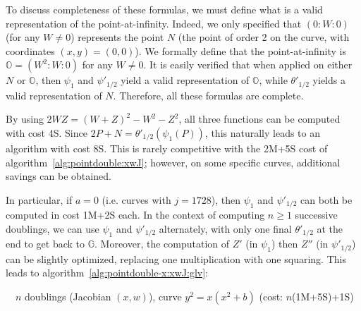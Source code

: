 \documentclass{llncs}
\newcommand{\bG}{\mathbb{G}}
\newcommand{\neutral}{\mathbb{O}}
\begin{document}
To discuss completeness of these formulas, we must define what is a
valid representation of the point-at-infinity. Indeed, we only specified
that $(0{:}W{:}0)$ (for any $W \neq 0$) represents the point $N$ (the
point of order 2 on the curve, with coordinates $(x,y) = (0,0)$). We
formally define that the point-at-infinity is $\neutral = (W^2{:}W{:}0)$
for any $W\neq 0$. It is easily verified that when applied on either $N$
or $\neutral$, then $\psi_1$ and $\psi'_{1/2}$ yield a valid
representation of $\neutral$, while $\theta'_{1/2}$ yields a valid
representation of $N$. Therefore, all these formulas are complete.

By using $2WZ = (W+Z)^2 - W^2 - Z^2$, all three functions can be
computed with cost 4S. Since $2P+N = \theta'_{1/2}(\psi_1(P))$, this
naturally leads to an algorithm with cost 8S. This is rarely competitive
with the 2M+5S cost of algorithm~\ref{alg:pointdouble:xwJ}; however, on
some specific curves, additional savings can be obtained.

In particular, if $a = 0$ (i.e. curves with $j = 1728$), then $\psi_1$
and $\psi'_{1/2}$ can both be computed in cost 1M+2S each. In the
context of computing $n \geq 1$ successive doublings, we can use
$\psi_1$ and $\psi'_{1/2}$ alternately, with only one final
$\theta'_{1/2}$ at the end to get back to $\bG$. Moreover, the
computation of $Z'$ (in $\psi_1$) then $Z''$ (in $\psi'_{1/2}$) can be
slightly optimized, replacing one multiplication with one squaring. This
leads to algorithm~\ref{alg:pointdouble-x:xwJ:glv}:

\begin{algorithm}[H]
    \caption{\ \ $n$ doublings (Jacobian $(x,w)$), curve $y^2 = x(x^2 + b)$ (cost: $n$(1M+5S)+1S)}\label{alg:pointdouble-x:xwJ:glv}
    \begin{algorithmic}[1]
        \EndFor
    \end{algorithmic}
\end{algorithm}
\end{document}
